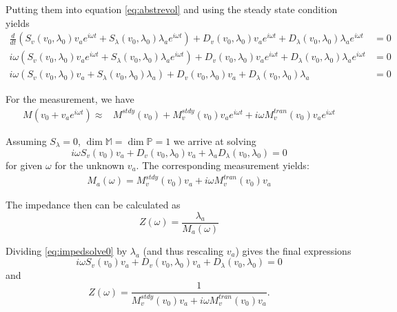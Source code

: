 \documentclass[12pt]{amsproc}
\newcommand{\PP}{\mathbb{P}}
\newcommand{\MM}{\mathbb{M}}
\newcommand{\Exp}[1]{e^{#1}}
\begin{document}
Putting them into equation \eqref{eq:abstrevol}  and using the steady state condition yields
\begin{equation*}
  \begin{split}
    \frac{d}{dt}\left( 
      S_v(v_0,\lambda_0)v_a\Exp{i\omega  t}+
      S_\lambda(v_0,\lambda_0)\lambda_a\Exp{i\omega  t}\right)+ 
    D_v(v_0,\lambda_0)v_a\Exp{i\omega  t}+
    D_\lambda(v_0,\lambda_0)\lambda_a\Exp{i\omega  t}&=0\\
    i\omega\left( 
      S_v(v_0,\lambda_0)v_a\Exp{i\omega  t}+
      S_\lambda(v_0,\lambda_0)\lambda_a\Exp{i\omega  t}\right)+ 
    D_v(v_0,\lambda_0)v_a\Exp{i\omega  t}+
    D_\lambda(v_0,\lambda_0)\lambda_a\Exp{i\omega  t}&=0\\
    i\omega\left( 
      S_v(v_0,\lambda_0)v_a+
      S_\lambda(v_0,\lambda_0)\lambda_a\right)+ 
    D_v(v_0,\lambda_0)v_a+
    D_\lambda(v_0,\lambda_0)\lambda_a&=0
  \end{split}
\end{equation*}


For the measurement, we have
\begin{align*}
      M(v_0+v_a\Exp{i\omega  t})\approx&M^{stdy}(v_0)+ 
    M^{stdy}_v(v_0)v_a\Exp{i\omega  t} +  i\omega M^{tran}_v(v_0)v_a\Exp{i\omega  t}
\end{align*}

Assuming $S_\lambda=0$, $\dim \MM =\dim \PP=1$ we arrive at solving 
\begin{equation}\label{eq:impedsolve0}
    i\omega 
      S_v(v_0)v_a+
    D_v(v_0,\lambda_0)v_a+
    \lambda_a D_\lambda(v_0,\lambda_0)=0
\end{equation}
for given $\omega$ for the  unknown $v_a$.
The corresponding measurement yields:
\begin{align*}
  M_a(\omega)= M^{stdy}_v(v_0)v_a + i\omega M^{tran}_v(v_0)v_a 
\end{align*}

The impedance then can be calculated as 
\begin{equation*}\label{eq:imped0}
  Z(\omega)= \frac{\lambda_a}{M_a(\omega)}
\end{equation*}

Dividing \eqref{eq:impedsolve0} by  $\lambda_a$ (and thus rescaling $v_a$) gives the final expressions
\begin{equation}\label{eq:impedsolve}
    i\omega 
      S_v(v_0)v_a+
    D_v(v_0,\lambda_0)v_a+
    D_\lambda(v_0,\lambda_0)=0
\end{equation}
and
\begin{equation}\label{eq:imped}
  Z(\omega)= \frac{1}{ M^{stdy}_v(v_0)v_a + i\omega M^{tran}_v(v_0)v_a}.
\end{equation}
\end{document}
